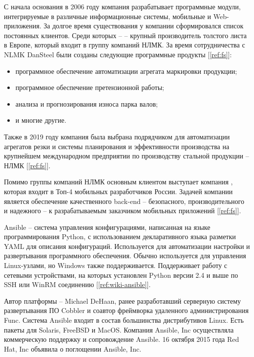 С начала основания в 2006 году компания  разрабатывает
программные модули, интегрируемые в различные информационные системы, мобильные
и Web- приложения. За долгое время существования у компании сформировался список
постоянных клиентов. Среди которых --  -- крупный
производитель толстого листа в Европе, который входит в группу компаний НЛМК. За
время сотрудничества с NLMK DanSteel были созданы следующие программные
продукты [\ref{ref:fs}]:
\begin{itemize}
    \item программное обеспечение автоматизации агрегата маркировки продукции;
    \item программное обеспечение претензионной работы;
    \item анализа и прогнозирования износа парка валов;
    \item и многие другие.
\end{itemize}

Также в 2019 году компания была выбрана подрядчиком для автоматизации агрегатов
резки и системы планирования и эффективности производства на крупнейшем
международном предприятии по производству стальной продукции -- НЛМК [\ref{ref:fs}].

Помимо группы компаний НЛМК основным клиентом  выступает
компания , которая входит в Топ-4 мобильных разработчиков
России. Задачей компании является обеспечение качественного back-end --
безопасного, производительного и надежного -- к разрабатываемым заказчиком
мобильных приложений [\ref{ref:fs}].

Ansible -- система управления конфигурациями, написанная на языке
программирования Python, с использованием декларативного языка разметки YAML для
описания конфигураций. Используется для автоматизации настройки и развертывания
программного обеспечения. Обычно используется для управления Linux-узлами, но
Windows также поддерживается. Поддерживает работу с сетевыми устройствами, на
которых установлен Python версии 2.4 и выше по SSH или WinRM соединению
[\ref{ref:wiki-ansible}].

Автор платформы -- Michael DeHaan, ранее разработавший серверную систему
развертывания ПО Cobbler и соавтор фреймворка удаленного
администрирования Func. Система Ansible входит в состав большинства
дистрибутивов Linux. Есть пакеты для Solaris, FreeBSD и MacOS. Компания Ansible,
Inc осуществляла коммерческую поддержку и сопровождение Ansible. 16 октября 2015
года Red Hat, Inc объявила о поглощении Ansible, Inc.

